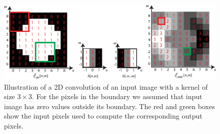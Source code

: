 \begin{figure}[h!]
\centerline{
\includegraphics[width=1\linewidth]{figures/linear_image_filtering/circle_conv_example.eps}
} 
\caption{
Illustration of a 2D convolution of an input image with a kernel of size $3 \times 3$.  
For the pixels in the boundary we assumed that input image has zero values outside its boundary. 
The red and green boxes show the input pixels used to compute the corresponding output pixels.
} 
\label{fig:circle_2dconv}
\end{figure}










